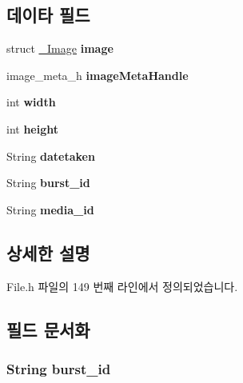 \subsection*{데이타 필드}
\begin{DoxyCompactItemize}
\item 
\hypertarget{struct__ImageExtends_a24c96542e7d59186d5d414503928920a}{struct \hyperlink{struct__Image}{\-\_\-\-Image} {\bfseries image}}\label{struct__ImageExtends_a24c96542e7d59186d5d414503928920a}

\item 
\hypertarget{struct__ImageExtends_a9cb994692e8daaf094623152f5f88d53}{image\-\_\-meta\-\_\-h {\bfseries image\-Meta\-Handle}}\label{struct__ImageExtends_a9cb994692e8daaf094623152f5f88d53}

\item 
\hypertarget{struct__ImageExtends_a2474a5474cbff19523a51eb1de01cda4}{int {\bfseries width}}\label{struct__ImageExtends_a2474a5474cbff19523a51eb1de01cda4}

\item 
\hypertarget{struct__ImageExtends_ad12fc34ce789bce6c8a05d8a17138534}{int {\bfseries height}}\label{struct__ImageExtends_ad12fc34ce789bce6c8a05d8a17138534}

\item 
\hypertarget{struct__ImageExtends_a077fc46f97fd76e21ef941afe99e6eaa}{String {\bfseries datetaken}}\label{struct__ImageExtends_a077fc46f97fd76e21ef941afe99e6eaa}

\item 
\hypertarget{struct__ImageExtends_ac42679c44413eda88288568352b90dd9}{String {\bfseries burst\-\_\-id}}\label{struct__ImageExtends_ac42679c44413eda88288568352b90dd9}

\item 
\hypertarget{struct__ImageExtends_af61699ef5054dcf075cbf29d59ed8d3c}{String {\bfseries media\-\_\-id}}\label{struct__ImageExtends_af61699ef5054dcf075cbf29d59ed8d3c}

\end{DoxyCompactItemize}


\subsection{상세한 설명}


File.\-h 파일의 149 번째 라인에서 정의되었습니다.



\subsection{필드 문서화}
\hypertarget{struct__ImageExtends_ac42679c44413eda88288568352b90dd9}{
\subsubsection[{burst\-\_\-id}]{\setlength{\rightskip}{0pt plus 5cm}String burst\-\_\-id}}\label{struct__ImageExtends_ac42679c44413eda88288568352b90dd9}


